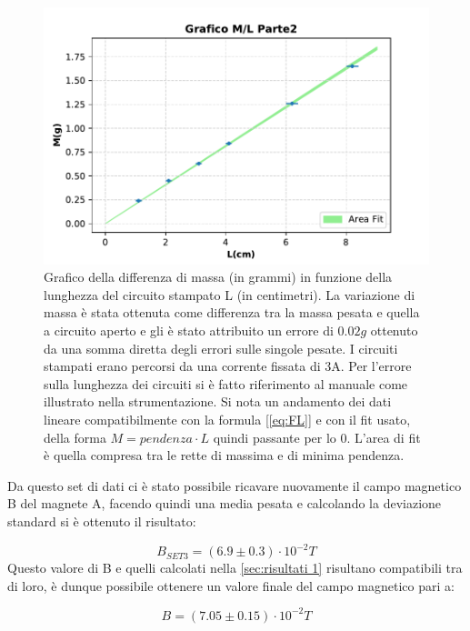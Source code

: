 {\fontsize{12}{18}\selectfont 

\begin{figure}[H]
  \centering
  \includegraphics[width=13.5cm]{Figures/GraficoMLParte2.pdf}
  \caption{Grafico della differenza di massa (in grammi) in funzione della lunghezza del circuito stampato L (in centimetri). La variazione di massa è stata ottenuta come differenza tra la massa pesata e quella a circuito aperto e gli è stato attribuito un errore di $0.02g$ ottenuto da una somma diretta degli errori sulle singole pesate. I circuiti stampati erano percorsi da una corrente fissata di 3A. Per l'errore sulla lunghezza dei circuiti si è fatto riferimento al manuale come illustrato nella strumentazione. Si nota un andamento dei dati lineare compatibilmente con la formula [\ref{eq:FL}] e con il fit usato, della forma $M = pendenza \cdot L$ quindi passante per lo 0. L'area di fit è quella compresa tra le rette di massima e di minima pendenza.}   
  \label{fig:GraficoParteII}
\end{figure}
Da questo set di dati ci è stato possibile ricavare nuovamente il campo magnetico B del magnete A, facendo quindi una media pesata e calcolando la deviazione standard si è ottenuto il risultato:

\par
\begin{equation*}
    B_{SET3} = (6.9 \pm 0.3)\cdot 10^{-2}T
\end{equation*}
Questo valore di B e quelli calcolati nella \autoref{sec:risultati 1} risultano compatibili tra di loro, è dunque possibile ottenere un valore finale del campo magnetico pari a:

\begin{equation*}
    B = (7.05 \pm 0.15)\cdot 10^{-2}T 
\end{equation*}

\par}